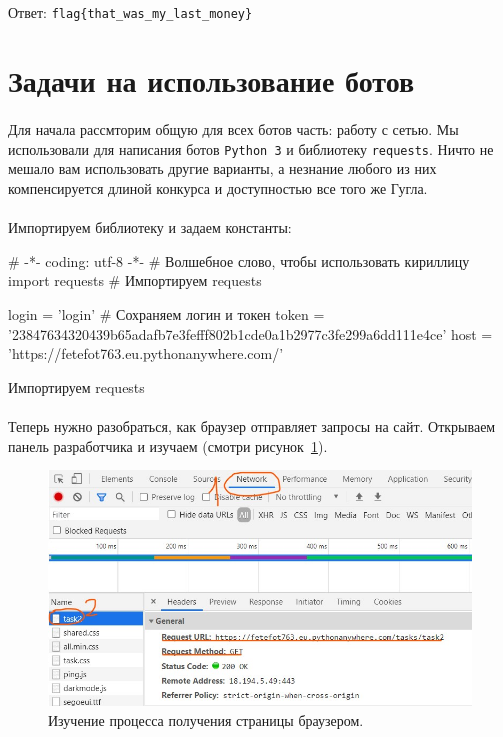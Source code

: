 \documentclass[12pt]{article}
\begin{document}
    \paragraph{}
    Ответ: \verb|flag{that_was_my_last_money}|

    \newpage

    \section{Задачи на использование ботов}
	\paragraph{}
    Для начала рассмторим общую для всех ботов часть: работу с сетью.
	Мы использовали для написания ботов \verb|Python 3| и библиотеку \verb|requests|.
	Ничто не мешало вам использовать другие варианты,
	а незнание любого из них компенсируется длиной конкурса и доступностью все того же Гугла.
	\paragraph{}
    Импортируем библиотеку и задаем константы:
    \begin{listing}[H]
        \begin{pythoncode}
# -*- coding: utf-8 -*- # Волшебное слово, чтобы использовать кириллицу
import requests # Импортируем requests

login = 'login' # Сохраняем логин и токен
token = '23847634320439b65adafb7e3fefff802b1cde0a1b2977c3fe299a6dd111e4ce'
host = 'https://fetefot763.eu.pythonanywhere.com/'
        \end{pythoncode}
        \caption{Импортируем requests}
        \label{lst:import_requests}
    \end{listing}
    \paragraph{}
    Теперь нужно разобраться, как браузер отправляет запросы на сайт.
    Открываем панель разработчика и изучаем (смотри рисунок~\ref{fig:browser1}).
    \begin{figure}[H]
        \centering
        \includegraphics[width=15cm]{BrowserNetworkAnalysis0}
        \caption{Изучение процесса получения страницы браузером.}
        \label{fig:browser1}
    \end{figure}
\end{document}
